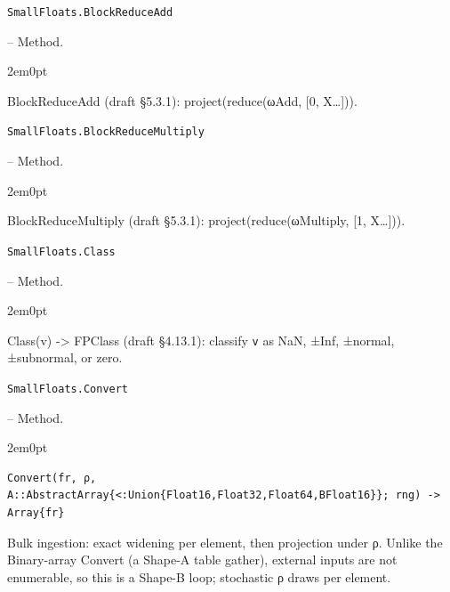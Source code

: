 \par\medskip\noindent\begin{minipage}{\linewidth}
\hypertarget{13767263915777893890}{\texttt{SmallFloats.BlockReduceAdd}}  -- {Method.}
\nopagebreak
\begin{adjustwidth}{2em}{0pt}

BlockReduceAdd (draft §5.3.1): project(reduce(ωAdd, [0, X…])).



\end{adjustwidth}
\end{minipage}
\par\medskip

\par\medskip\noindent\begin{minipage}{\linewidth}
\hypertarget{17748774098335709824}{\texttt{SmallFloats.BlockReduceMultiply}}  -- {Method.}
\nopagebreak
\begin{adjustwidth}{2em}{0pt}

BlockReduceMultiply (draft §5.3.1): project(reduce(ωMultiply, [1, X…])).



\end{adjustwidth}
\end{minipage}
\par\medskip

\par\medskip\noindent\begin{minipage}{\linewidth}
\hypertarget{17727979567356838264}{\texttt{SmallFloats.Class}}  -- {Method.}
\nopagebreak
\begin{adjustwidth}{2em}{0pt}

Class(v) -> FPClass (draft §4.13.1): classify \texttt{v} as NaN, ±Inf, ±normal, ±subnormal, or zero.



\end{adjustwidth}
\end{minipage}
\par\medskip

\par\medskip\noindent\begin{minipage}{\linewidth}
\hypertarget{829764723835457682}{\texttt{SmallFloats.Convert}}  -- {Method.}
\nopagebreak
\begin{adjustwidth}{2em}{0pt}


\begin{verbatim}
Convert(fr, ρ, A::AbstractArray{<:Union{Float16,Float32,Float64,BFloat16}}; rng) -> Array{fr}
\end{verbatim}

Bulk ingestion: exact widening per element, then projection under ρ. Unlike the Binary-array Convert (a Shape-A table gather), external inputs are not enumerable, so this is a Shape-B loop; stochastic ρ draws per element.



\end{adjustwidth}
\end{minipage}
\par\medskip

